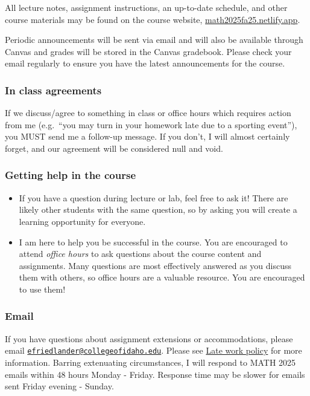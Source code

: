 \documentclass[
  letterpaper,
  DIV=11,
  numbers=noendperiod]{scrartcl}
\providecommand{\tightlist}{%
  \setlength{\itemsep}{0pt}\setlength{\parskip}{0pt}}
\begin{document}
All lecture notes, assignment instructions, an up-to-date schedule, and
other course materials may be found on the course website,
\href{https://math2025fa25.netlify.app}{math2025fa25.netlify.app}.

Periodic announcements will be sent via email and will also be available
through Canvas and grades will be stored in the Canvas gradebook. Please
check your email regularly to ensure you have the latest announcements
for the course.

\subsubsection{In class agreements}\label{in-class-agreements}

If we discuss/agree to something in class or office hours which requires
action from me (e.g.~``you may turn in your homework late due to a
sporting event''), you MUST send me a follow-up message. If you don't, I
will almost certainly forget, and our agreement will be considered null
and void.

\subsubsection{Getting help in the
course}\label{getting-help-in-the-course}

\begin{itemize}
\tightlist
\item
  If you have a question during lecture or lab, feel free to ask it!
  There are likely other students with the same question, so by asking
  you will create a learning opportunity for everyone.
\item
  I am here to help you be successful in the course. You are encouraged
  to attend \emph{office hours} to ask questions about the course
  content and assignments. Many questions are most effectively answered
  as you discuss them with others, so office hours are a valuable
  resource. You are encouraged to use them!
\end{itemize}

\subsubsection{Email}\label{email}

If you have questions about assignment extensions or accommodations,
please email
\href{mailto:efriedlander@collegeofidaho.edu}{\nolinkurl{efriedlander@collegeofidaho.edu}}.
Please see \hyperref[late-work-policy]{Late work policy} for more
information. Barring extenuating circumstances, I will respond to MATH
2025 emails within 48 hours Monday - Friday. Response time may be slower
for emails sent Friday evening - Sunday.
\end{document}
